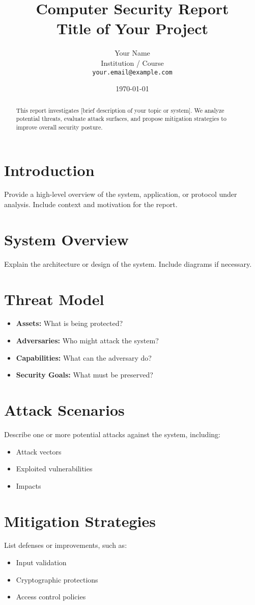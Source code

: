 \documentclass[11pt]{article}
\title{\textbf{Computer Security Report} \\ \large Title of Your Project}
\author{Your Name \\
Institution / Course \\
\texttt{your.email@example.com}
}
\date{\today}
\begin{document}
\maketitle

\begin{abstract}
This report investigates [brief description of your topic or system]. We analyze potential threats, evaluate attack surfaces, and propose mitigation strategies to improve overall security posture.
\end{abstract}

\section{Introduction}
Provide a high-level overview of the system, application, or protocol under analysis. Include context and motivation for the report.

\section{System Overview}
Explain the architecture or design of the system. Include diagrams if necessary.

\section{Threat Model}
\begin{itemize}
    \item \textbf{Assets:} What is being protected?
    \item \textbf{Adversaries:} Who might attack the system?
    \item \textbf{Capabilities:} What can the adversary do?
    \item \textbf{Security Goals:} What must be preserved?
\end{itemize}

\section{Attack Scenarios}
Describe one or more potential attacks against the system, including:
\begin{itemize}
    \item Attack vectors
    \item Exploited vulnerabilities
    \item Impacts
\end{itemize}

\section{Mitigation Strategies}
List defenses or improvements, such as:
\begin{itemize}
    \item Input validation
    \item Cryptographic protections
    \item Access control policies
\end{itemize}
\end{document}
